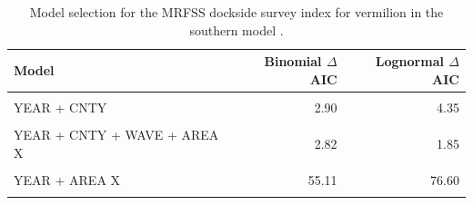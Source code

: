 \documentclass[11pt,
  english,
  a4paper,
]{article}
\begin{document}
\begin{table}

\caption{\label{tab:tab-model-select-mrfss}Model selection for the MRFSS dockside survey index for vermilion in the southern model .}
\centering
\begin{tabular}[t]{lrr}
\toprule
Model & Binomial $\Delta$AIC & Lognormal $\Delta$AIC\\
\midrule
\cellcolor{gray!6}{1} & \cellcolor{gray!6}{111.56} & \cellcolor{gray!6}{146.83}\\
YEAR + CNTY & 2.90 & 4.35\\
\cellcolor{gray!6}{YEAR + CNTY + WAVE} & \cellcolor{gray!6}{6.40} & \cellcolor{gray!6}{0.00}\\
YEAR + CNTY + WAVE + AREA X & 2.82 & 1.85\\
\cellcolor{gray!6}{YEAR + WAVE + AREA X} & \cellcolor{gray!6}{57.46} & \cellcolor{gray!6}{75.30}\\
\addlinespace
YEAR + AREA X & 55.11 & 76.60\\
\cellcolor{gray!6}{YEAR + CNTY + AREA X} & \cellcolor{gray!6}{0.00} & \cellcolor{gray!6}{6.19}\\
\bottomrule
\end{tabular}
\end{table}

\FloatBarrier
\end{document}
